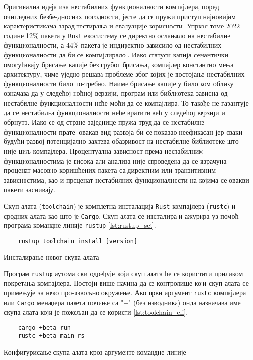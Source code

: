 Оригинална идеја иза нестабилних функционалности компајлера, поред очигледних безбе\hyp{}дносних погодности, 
јесте да се пружи приступ најновијим карактеристикама зарад тестирања и евалуације корисности.
Упркос томе 2022. године 12\%  пакета у \verb|Rust| екосистему се директно ослањало на нестабилне функционалности, а 
44\% пакета је индиректно зависило од нестабилних функционалности да би се компајлирало \cite{unstable-flags}. Иако 
статуси капија семантички омогућавају брисање капије без грубог брисања, компајлер константно мења архитектуру, чиме уједно 
решава проблеме због којих је постојање нестабилних функционалности било по\hyp{}требно. Наиме брисање капије 
у било ком облику означава да у следећој ноћној верзији, програм или библиотека зависна од нестабилне функционалности
неће моћи да се компајлира. То такође не гарантује да се нестабилна функционалности неће вратити већ у следећој
верзији и обрнуто. Иако се од стране заједнице пружа труд да се нестабилне функционалности прате, овакав вид 
развоја би се показао неефикасан јер сваки будући развој потенцијално захтева обазривост на нестабилне 
библиотеке што није циљ компајлера. Процентуална зависност према нестабилним функционалностима је висока али 
анализа није спроведена да се израчуна проценат масовно коришћених пакета са директним или транзитивним
зависностима, као и проценат нестабилних функционалности на којима се овакви пакети заснивају.

Скуп алата (\verb|toolchain|) је комплетна инсталација \verb|Rust| компајлера (\verb|rustc|) и сродних алата као што 
је \verb|Cargo|. Скуп алата се инсталира и ажурира уз помоћ програма командне линије \verb|rustup| \ref{lst:rustup_set}. 

\begin{listing}[H]
\begin{verbatim}
    rustup toolchain install [version]
\end{verbatim}
\caption{Инсталирање новог скупа алата}
\label{lst:rustup_set}
\end{listing}

Програм \verb|rustup| аутоматски одређује који скуп алата ће се користити приликом покретања компајлера. 
Постоји више начина да се контролише који скуп алата се примењује за неко про\hyp{}извољно окружење.
Ако први аргумент \verb|rustc| компајлера или \verb|Cargo| менаџера пакета почиње са "+" (без наводника) 
онда назначава име скупа алата који је пожељан да се користи \ref{lst:toolchain_cli}. 

\begin{listing}[H]
\begin{verbatim}
    cargo +beta run 
    rustc +beta main.rs
\end{verbatim}
\caption{Конфигурисање скупа алата кроз аргументе командне линије}
\label{lst:toolchain_cli}
\end{listing}

